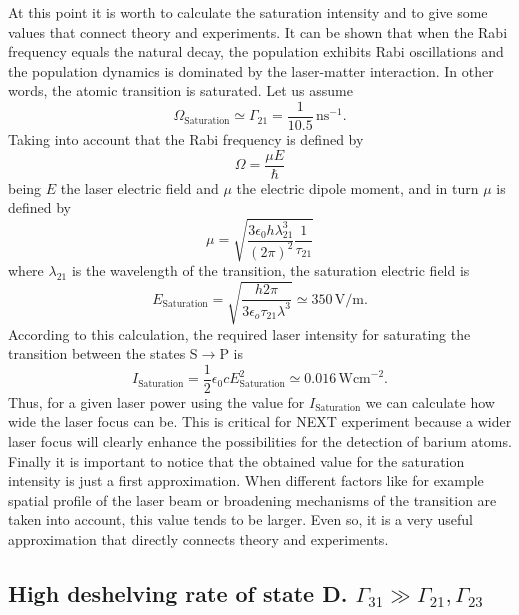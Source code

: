 At this point it is worth to calculate the saturation intensity and to give some values that connect theory and experiments. It can be shown \cite{Sh90} that when the Rabi frequency equals the natural decay, the population exhibits Rabi oscillations and the population dynamics is dominated by the laser-matter interaction. In other words, the atomic transition is saturated. Let us assume 
\begin{equation}
\Omega_{\text{Saturation}}\simeq\Gamma_{21}=\frac{1}{10.5}\,\text{ns}^{-1}.
\end{equation}
Taking into account that the Rabi frequency is defined by
\begin{equation}
\Omega=\frac{\mu E}{\hbar}
\end{equation}
being $E$ the laser electric field and $\mu$ the electric dipole moment, and in turn $\mu$ is defined by
\begin{equation}
\mu=\sqrt{\frac{3\epsilon_0 h \lambda_{21}^3}{(2\pi)^2}\frac{1}{\tau_{21}}}
\end{equation}
where $\lambda_{21}$ is the wavelength of the transition, the saturation electric field is
\begin{equation}
E_{\text{Saturation}}=\sqrt{\frac{h2\pi}{3\epsilon_o\tau_{21}\lambda^3}}\simeq350\,\text{V/m}.
\end{equation}
According to this calculation, the required laser intensity for saturating the transition between the states S$\rightarrow$P is
\begin{equation}
I_{\text{Saturation}}=\frac{1}{2}\epsilon_0cE^2_{\text{Saturation}}\simeq0.016\,\text{Wcm}^{-2}.
\end{equation}
Thus, for a given laser power using the value for $I_{\text{Saturation}}$ we can calculate how wide the laser focus can be. This is critical for NEXT experiment because a wider laser focus will clearly enhance the possibilities for the detection of barium atoms. Finally it is important to notice that the obtained value for the saturation intensity is just a first approximation. When different factors like for example spatial profile of the laser beam or broadening mechanisms of the transition are taken into account, this value tends to be larger. Even so, it is a very useful approximation that directly connects theory and experiments.


\subsection{High deshelving rate of state D. $\Gamma_{31}\gg\Gamma_{21}, \Gamma_{23}$}
\label{HighD}

